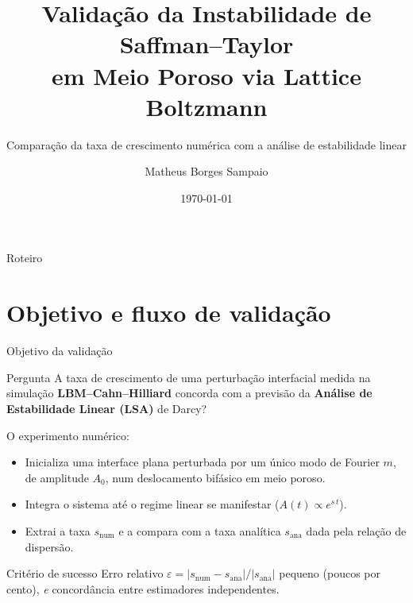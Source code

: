 \documentclass[aspectratio=169,11pt]{beamer}
\title[Validação LSA via LBM]{Validação da Instabilidade de Saffman--Taylor\\
       em Meio Poroso via Lattice Boltzmann}
\subtitle{Comparação da taxa de crescimento numérica com a análise de estabilidade linear}
\author{Matheus Borges Sampaio}
\date{\today}
\newcommand{\snum}{s_{\mathrm{num}}}
\newcommand{\sana}{s_{\mathrm{ana}}}
\begin{document}
\begin{frame}
  \titlepage
\end{frame}

\begin{frame}{Roteiro}
  \tableofcontents
\end{frame}

\section{Objetivo e fluxo de validação}
\begin{frame}{Objetivo da validação}
  \begin{block}{Pergunta}
    A taxa de crescimento de uma perturbação interfacial medida na simulação
    \textbf{LBM--Cahn--Hilliard} concorda com a previsão da
    \textbf{Análise de Estabilidade Linear (LSA)} de Darcy?
  \end{block}
  \vspace{0.4em}
  O experimento numérico:
  \begin{itemize}
    \item Inicializa uma interface plana perturbada por um único modo de Fourier
          $m$, de amplitude $A_0$, num deslocamento bifásico em meio poroso.
    \item Integra o sistema até o regime linear se manifestar
          ($A(t)\propto e^{s\,t}$).
    \item Extrai a taxa $\snum$ e a compara com a taxa analítica $\sana$
          dada pela relação de dispersão.
  \end{itemize}
  \begin{alertblock}{Critério de sucesso}
    Erro relativo $\varepsilon = |\snum-\sana|/|\sana|$ pequeno
    (poucos por cento), \emph{e} concordância entre estimadores independentes.
  \end{alertblock}
\end{frame}
\end{document}

